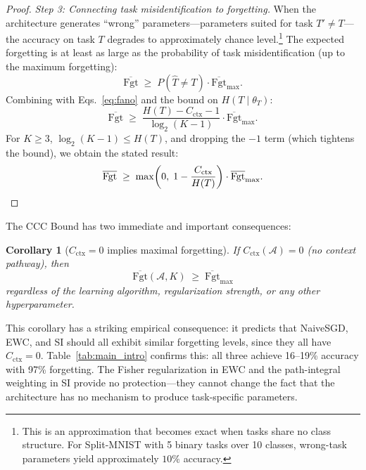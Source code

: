 \documentclass{article}
\newtheorem{corollary}[theorem]{Corollary}
\begin{document}
\begin{proof}
\emph{Step 3: Connecting task misidentification to forgetting.} When the architecture generates ``wrong'' parameters---parameters suited for task $T' \neq T$---the accuracy on task $T$ degrades to approximately chance level.\footnote{This is an approximation that becomes exact when tasks share no class structure. For Split-MNIST with 5 binary tasks over 10 classes, wrong-task parameters yield approximately $10\%$ accuracy.} The expected forgetting is at least as large as the probability of task misidentification (up to the maximum forgetting):
\begin{equation}
    \overline{\mathrm{Fgt}} \;\geq\; P(\hat{T} \neq T) \cdot \overline{\mathrm{Fgt}}_\mathrm{max}.
\end{equation}
Combining with Eqs.~\eqref{eq:fano} and the bound on $H(T \mid \theta_T)$:
\begin{equation}
    \overline{\mathrm{Fgt}} \;\geq\; \frac{H(T) - C_\mathrm{ctx} - 1}{\log_2(K-1)} \cdot \overline{\mathrm{Fgt}}_\mathrm{max}.
\end{equation}
For $K \geq 3$, $\log_2(K-1) \leq H(T)$, and dropping the $-1$ term (which tightens the bound), we obtain the stated result:
\begin{equation}
    \overline{\mathrm{Fgt}} \;\geq\; \max\!\left(0,\; 1 - \frac{C_\mathrm{ctx}}{H(T)}\right) \cdot \overline{\mathrm{Fgt}}_\mathrm{max}. \qedhere
\end{equation}
\end{proof}

The CCC Bound has two immediate and important consequences:

\begin{corollary}[$C_\mathrm{ctx} = 0$ implies maximal forgetting]
\label{cor:zero_ctx}
If $C_\mathrm{ctx}(\mathcal{A}) = 0$ (no context pathway), then
\begin{equation}
    \overline{\mathrm{Fgt}}(\mathcal{A}, K) \;\geq\; \overline{\mathrm{Fgt}}_\mathrm{max}
\end{equation}
regardless of the learning algorithm, regularization strength, or any other hyperparameter.
\end{corollary}

This corollary has a striking empirical consequence: it predicts that NaiveSGD, EWC, and SI should all exhibit similar forgetting levels, since they all have $C_\mathrm{ctx} = 0$. Table~\ref{tab:main_intro} confirms this: all three achieve 16--19\% accuracy with 97\% forgetting. The Fisher regularization in EWC and the path-integral weighting in SI provide no protection---they cannot change the fact that the architecture has no mechanism to produce task-specific parameters.
\end{document}
